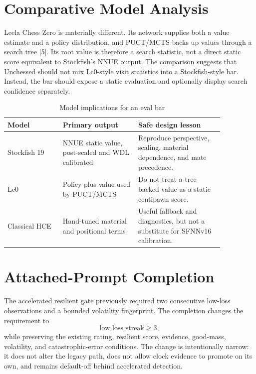 \documentclass[10pt,conference]{IEEEtran}
\begin{document}
\section{Comparative Model Analysis}
Leela Chess Zero is materially different. Its network supplies both a value estimate and a policy distribution, and PUCT/MCTS backs up values through a search tree [5]. Its root value is therefore a search statistic, not a direct static score equivalent to Stockfish's NNUE output. The comparison suggests that Unchessed should not mix Lc0-style visit statistics into a Stockfish-style bar. Instead, the bar should expose a static evaluation and optionally display search confidence separately.

\begin{table}[t]
\centering
\caption{Model implications for an eval bar}
\label{tab:comparison}
\begin{tabular}{p{0.22\linewidth}p{0.30\linewidth}p{0.34\linewidth}}
\toprule
Model & Primary output & Safe design lesson\\
\midrule
Stockfish 19 & NNUE static value, post-scaled and WDL calibrated & Reproduce perspective, scaling, material dependence, and mate precedence.\\
Lc0 & Policy plus value used by PUCT/MCTS & Do not treat a tree-backed value as a static centipawn score.\\
Classical HCE & Hand-tuned material and positional terms & Useful fallback and diagnostics, but not a substitute for SFNNv16 calibration.\\
\bottomrule
\end{tabular}
\end{table}

\section{Attached-Prompt Completion}
The accelerated resilient gate previously required two consecutive low-loss observations and a bounded volatility fingerprint. The completion changes the requirement to
\begin{equation}
 \mathrm{low\_loss\_streak}\geq 3,
\end{equation}
while preserving the existing rating, resilient score, evidence, good-mass, volatility, and catastrophic-error conditions. The change is intentionally narrow: it does not alter the legacy path, does not allow clock evidence to promote on its own, and remains default-off behind accelerated detection.
\end{document}
